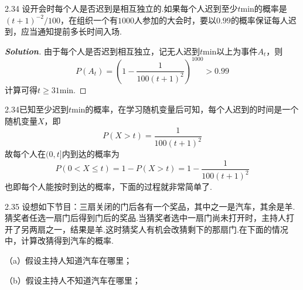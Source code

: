 \documentclass[10pt, a4paper, oneside]{ctexart}
\newenvironment{solution}{\begin{proof}[\bf Solution]}{\end{proof}}
\begin{document}
2.34 设开会时每个人是否迟到是相互独立的.如果每个人迟到至少$t$min的概率是$(t+1)^{-2}/100$，在组织一个有$1000$人参加的大会时，要以$0.99$的概率保证每人迟到，应当通知提前多长时间入场.
\begin{solution}
由于每个人是否迟到相互独立，记无人迟到$t$min以上为事件$A_t$，则
\[P({A_t}) = {(1 - \frac{1}{{100{{(t + 1)}^2}}})^{1000}} > 0.99\]
计算可得$t\geqslant 31$min.
\end{solution}
\begin{remark}
2.34已知至少迟到$t$min的概率，在学习随机变量后可知，每个人迟到的时间是一个随机变量$X$，即
\[
P(X>t)=\frac{1}{100(t+1)^2}
\]
故每个人在$(0,t]$内到达的概率为
\[P(0 < X \leqslant t) = 1 - P(X > t) = 1 - \frac{1}{{100{{(t + 1)}^2}}}\]
也即每个人能按时到达的概率，下面的过程就非常简单了.
\end{remark}

2.35 设想如下节目：三扇关闭的门后各有一个奖品，其中之一是汽车，其余是羊.猜奖者任选一扇门后得到门后的奖品.当猜奖者选中一扇门尚未打开时，主持人打开了另两扇之一，结果是羊.这时猜奖人有机会改猜剩下的那扇门.在下面的情况中，计算改猜得到汽车的概率.

（a）假设主持人知道汽车在哪里；

（b）假设主持人不知道汽车在哪里；
\end{document}

